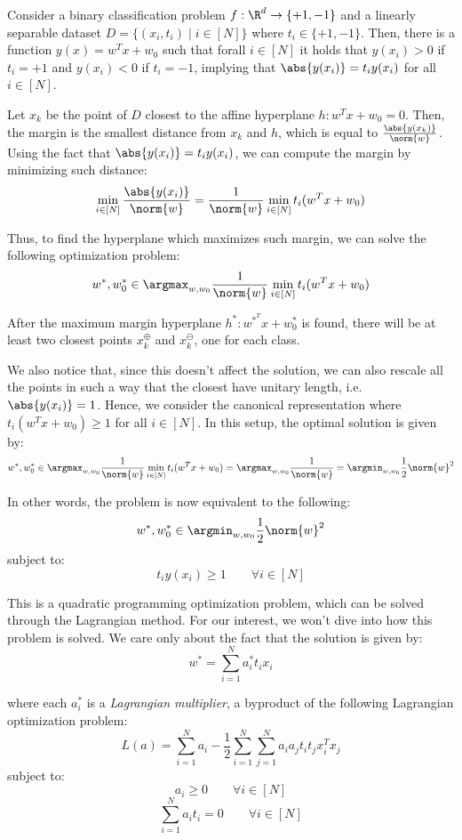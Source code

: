 \documentclass[a4paper, 12pt]{report}
\begin{document}
    Consider a binary classification problem $f : \R^d \to \{+1, -1\}$ and a linearly separable dataset $D = \{(x_i,t_i) \mid i \in [N]\}$ where $t_i \in \{+1, -1\}$. Then, there is a function $y(x) = w^Tx + w_0$ such that forall $i \in [N]$ it holds that $y(x_i) > 0$ if $t_i = +1$ and $y(x_i) < 0$ if $t_i = -1$, implying that $\abs{y(x_i)} = t_i y(x_i)$ for all $i \in [N]$.

    Let $x_k$ be the point of $D$ closest to the affine hyperplane $h :  w^Tx + w_0 = 0$. Then, the margin is the smallest distance from $x_k$ and $h$, which is equal to $\frac{\abs{y(x_k)}}{\norm{w}}$. Using the fact that $\abs{y(x_i)} = t_i y(x_i)$, we can compute the margin by minimizing such distance:
    \[\min_{i \in [N]} \frac{\abs{y(x_i)}}{\norm{w}} = \frac{1}{\norm{w}} \min_{i \in [N]} t_i(w^Tx + w_0)\]

    Thus, to find the hyperplane which maximizes such margin, we can solve the following optimization problem:
    \[w^*, w_0^* \in \argmax_{w, w_0} \frac{1}{\norm{w}} \min_{i \in [N]} t_i(w^Tx + w_0)\]
    
    After the maximum margin hyperplane $h^* : w^{*^T}x+w_0^*$ is found, there will be at least two closest points $x_k^{\oplus}$ and $x_k^{\ominus}$, one for each class.

    We also notice that, since this doesn't affect the solution, we can also rescale all the points in such a way that the closest have unitary length, i.e. $\abs{y(x_i)} = 1$. Hence, we consider the canonical representation where $t_i(w^Tx + w_0) \geq 1$ for all $i \in [N]$. In this setup, the optimal solution is given by:
    \[w^*, w_0^* \in \argmax_{w, w_0} \frac{1}{\norm{w}} \min_{i \in [N]} t_i(w^Tx + w_0) = \argmax_{w, w_0} \frac{1}{\norm{w}} = \argmin_{w, w_0} \frac{1}{2} \norm{w}^2\]

    In other words, the problem is now equivalent to the following:
    \[w^*, w_0^* \in \argmin_{w, w_0} \frac{1}{2} \norm{w}^2\]
    subject to:
    \[t_i y(x_i) \geq 1 \qquad \forall i \in [N]\]
    
    This is a quadratic programming optimization problem, which can be solved through the Lagrangian method. For our interest, we won't dive into how this problem is solved. We care only about the fact that the solution is given by:
    \[w^* = \sum_{i = 1}^{N} a_i^* t_i x_i\]

    where each $a_i^*$ is a \textit{Lagrangian multiplier}, a byproduct of the following Lagrangian optimization problem:
    \[{L}(a) = \sum_{i = 1}^N a_i - \frac{1}{2} \sum_{i = 1}^N \sum_{j = 1}^N a_i a_j t_i t_j x_i^T x_j\]
    subject to:
    \[a_i \geq 0\qquad \forall i \in [N]\]
    \[\sum_{i = 1}^N a_i t_i = 0\qquad \forall i \in [N]\]
\end{document}
